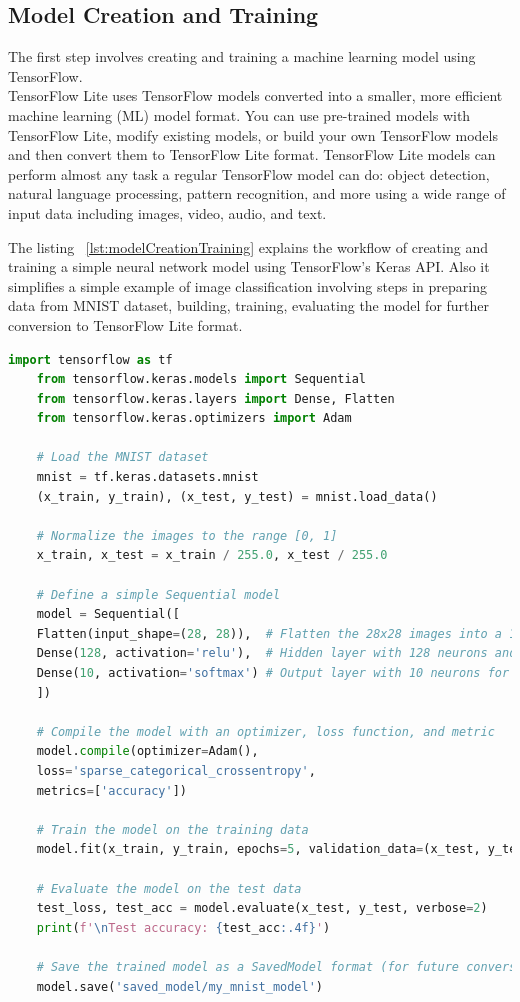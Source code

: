 \subsection{Model Creation and Training}
The first step involves creating and training a machine learning model using TensorFlow. 
\\TensorFlow Lite uses TensorFlow models converted into a smaller, more efficient machine learning (ML) model format. You can use pre-trained models with TensorFlow Lite, modify existing models, or build your own TensorFlow models and then convert them to TensorFlow Lite format. TensorFlow Lite models can perform almost any task a regular TensorFlow model can do: object detection, natural language processing, pattern recognition, and more using a wide range of input data including images, video, audio, and text. \cite{tensorflow_lite:2024}

The listing ~\ref{lst:modelCreationTraining} explains the workflow of creating and training a simple neural network model using TensorFlow's Keras API. Also it simplifies a simple example of image classification involving steps in preparing data from MNIST dataset, building, training, evaluating the model for further conversion to TensorFlow Lite format. \cite{tfModelCreationKeras:2024}

\begin{code}
\begin{lstlisting}[language=Python, caption={Model Creation and Training Example Using TensorFlow}, label={lst:modelCreationTraining}]
	import tensorflow as tf
	from tensorflow.keras.models import Sequential
	from tensorflow.keras.layers import Dense, Flatten
	from tensorflow.keras.optimizers import Adam
	
	# Load the MNIST dataset
	mnist = tf.keras.datasets.mnist
	(x_train, y_train), (x_test, y_test) = mnist.load_data()
	
	# Normalize the images to the range [0, 1]
	x_train, x_test = x_train / 255.0, x_test / 255.0
	
	# Define a simple Sequential model
	model = Sequential([
	Flatten(input_shape=(28, 28)),  # Flatten the 28x28 images into a 1D array of 784 elements
	Dense(128, activation='relu'),  # Hidden layer with 128 neurons and ReLU activation
	Dense(10, activation='softmax') # Output layer with 10 neurons for classification
	])
	
	# Compile the model with an optimizer, loss function, and metric
	model.compile(optimizer=Adam(),
	loss='sparse_categorical_crossentropy',
	metrics=['accuracy'])
	
	# Train the model on the training data
	model.fit(x_train, y_train, epochs=5, validation_data=(x_test, y_test))
	
	# Evaluate the model on the test data
	test_loss, test_acc = model.evaluate(x_test, y_test, verbose=2)
	print(f'\nTest accuracy: {test_acc:.4f}')
	
	# Save the trained model as a SavedModel format (for future conversion to TFLite)
	model.save('saved_model/my_mnist_model')
\end{lstlisting}
\end{code}

